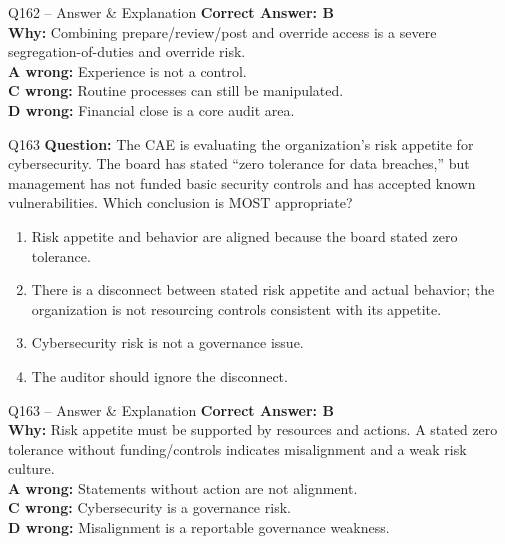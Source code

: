 \documentclass[aspectratio=169,10pt]{beamer}
\begin{document}
	\begin{frame}[t]{Q162 -- Answer \& Explanation}
		\small
		\textbf{Correct Answer: B} \\[4pt]
		\textbf{Why:} Combining prepare/review/post and override access is a severe segregation-of-duties and override risk. \\[4pt]
		\textbf{A wrong:} Experience is not a control. \\[2pt]
		\textbf{C wrong:} Routine processes can still be manipulated. \\[2pt]
		\textbf{D wrong:} Financial close is a core audit area.
	\end{frame}
	
	\begin{frame}[t]{Q163}
		\small
		\textbf{Question:} The CAE is evaluating the organization's risk appetite for cybersecurity. The board has stated ``zero tolerance for data breaches,'' but management has not funded basic security controls and has accepted known vulnerabilities. Which conclusion is MOST appropriate?
		\begin{enumerate}[label=\Alph*.,itemsep=1pt,topsep=2pt]
			\item Risk appetite and behavior are aligned because the board stated zero tolerance.
			\item There is a disconnect between stated risk appetite and actual behavior; the organization is not resourcing controls consistent with its appetite.
			\item Cybersecurity risk is not a governance issue.
			\item The auditor should ignore the disconnect.
		\end{enumerate}
	\end{frame}
	
	\begin{frame}[t]{Q163 -- Answer \& Explanation}
		\small
		\textbf{Correct Answer: B} \\[4pt]
		\textbf{Why:} Risk appetite must be supported by resources and actions. A stated zero tolerance without funding/controls indicates misalignment and a weak risk culture. \\[4pt]
		\textbf{A wrong:} Statements without action are not alignment. \\[2pt]
		\textbf{C wrong:} Cybersecurity is a governance risk. \\[2pt]
		\textbf{D wrong:} Misalignment is a reportable governance weakness.
	\end{frame}
	
\end{document}

